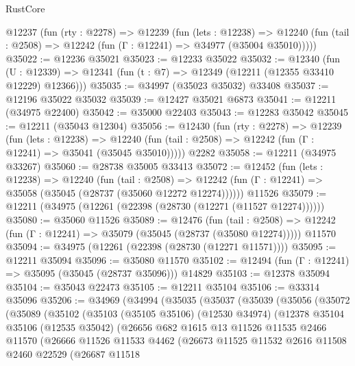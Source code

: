 \begin{lexlean}{RustCore}
\begin{coremodule}
  @12237
    (fun (rty : @2278) =>
    @12239
      (fun (lets : @12238) =>
      @12240 (fun (tail : @2508) => @12242 (fun (Γ : @12241) => @34977 (@35004 @35010)))))
@35022 := @12236 @35021
@35023 := @12233 @35022
@35032 := @12340
    (fun (U : @12339) => @12341 (fun (t : @7) => @12349 (@12211 (@12355 @33410 @12229) @12366)))
@35035 := @34997 (@35023 @35032) @33408
@35037 := @12196 @35022 @35032
@35039 := @12427 @35021 @6873
@35041 := @12211 (@34975 @22400)
@35042 := @35000 @22403
@35043 := @12283 @35042
@35045 := @12211 (@35043 @12304)
@35056 := @12430
    (fun (rty : @2278) =>
    @12239
      (fun (lets : @12238) =>
      @12240 (fun (tail : @2508) => @12242 (fun (Γ : @12241) => @35041 (@35045 @35010)))))
    @2282
@35058 := @12211 (@34975 @33267)
@35060 := @28738 @35005 @33413
@35072 := @12452
    (fun (lets : @12238) =>
    @12240
      (fun (tail : @2508) =>
      @12242 (fun (Γ : @12241) => @35058 (@35045 (@28737 (@35060 @12272 @12274))))))
    @11526
@35079 := @12211 (@34975 (@12261 (@22398 (@28730 (@12271 (@11527 @12274))))))
@35080 := @35060 @11526
@35089 := @12476
    (fun (tail : @2508) => @12242 (fun (Γ : @12241) => @35079 (@35045 (@28737 (@35080 @12274)))))
    @11570
@35094 := @34975 (@12261 (@22398 (@28730 (@12271 @11571))))
@35095 := @12211 @35094
@35096 := @35080 @11570
@35102 := @12494 (fun (Γ : @12241) => @35095 (@35045 (@28737 @35096))) @14829
@35103 := @12378 @35094
@35104 := @35043 @22473
@35105 := @12211 @35104
@35106 := @33314 @35096
@35206 := @34969
    (@34994
      (@35035
        (@35037
          (@35039
            (@35056
              (@35072
                (@35089
                  (@35102
                    (@35103
                      (@35105 @35106)
                      (@12530 @34974)
                      (@12378
                        @35104
                        @35106
                        (@12535 @35042)
                        (@26656
                          @682
                          @1615
                          @13
                          @11526
                          @11535
                          @2466
                          @11570
                          (@26666
                            @11526
                            @11533
                            @4462
                            (@26673
                              @11525
                              @11532
                              @2616
                              @11508
                              @2460
                              @22529
                              (@26687
                                @11518

\end{coremodule}
\end{lexlean}
